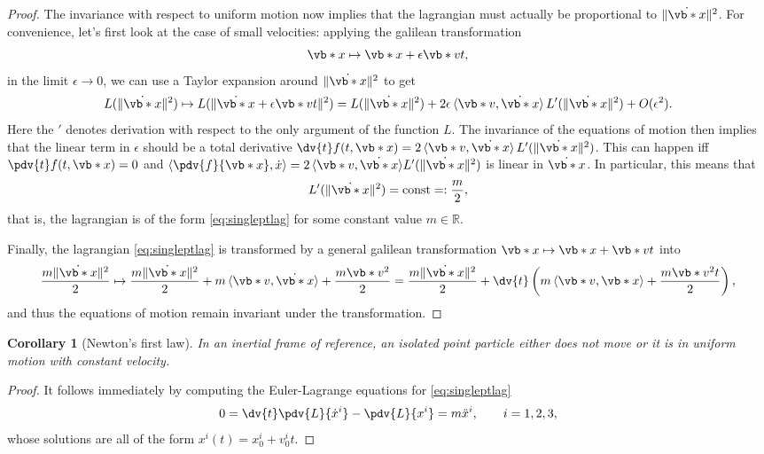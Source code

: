\documentclass[english,fontsize=11pt,paper=b5]{scrbook}
\numberwithin{equation}{chapter}
\newtheorem{corollary}[theorem]{Corollary}
\theoremstyle{definition}
\begin{document}
\begin{proof}
      The invariance with respect to uniform motion now implies that the lagrangian must actually be proportional to $\|\dot{\vb*{x}}\|^2$.
      For convenience, let's first look at the case of small velocities: applying the galilean transformation
      \begin{equation}
        \vb*{x} \mapsto \vb*{x} + \epsilon \vb*{v}t,
      \end{equation}
      in the limit $\epsilon \to 0$, we can use a Taylor expansion around $\|\dot{\vb*{x}}\|^2$ to get
      \begin{equation}
        L(\|\dot{\vb*{x}}\|^2) \mapsto L(\|\dot{\vb*{x}} + \epsilon \vb*{v}t\|^2) = L(\|\dot{\vb*{x}}\|^2) + 2\epsilon\,\langle\vb*{v}, \dot{\vb*{x}}\rangle\,L'(\|\dot{\vb*{x}}\|^2) + O(\epsilon^2).
      \end{equation}
      Here the $'$ denotes derivation with respect to the only argument of the function $L$.
      The invariance of the equations of motion then implies that the linear term in $\epsilon$ should be a total derivative $\dv{t} f(t, \vb*{x}) = 2\,\langle\vb*{v}, \dot{\vb*{x}}\rangle\,L'(\|\dot{\vb*{x}}\|^2)$.
      This can happen iff $\pdv{t} f(t, \vb*{x}) = 0$ and $\langle \pdv{f}{\vb*{x}}, \dot x\rangle  = 2\,\langle\vb*{v}, \dot{\vb*{x}}\rangle L'(\|\dot{\vb*{x}}\|^2)$ is linear in $\dot{\vb*{x}}$.
      In particular, this means that
      \begin{equation}
        L'(\|\dot{\vb*{x}}\|^2) = \mathrm{const} =: \frac{m}2,
      \end{equation}
      that is, the lagrangian is of the form \eqref{eq:singleptlag} for some constant value $m\in\mathbb{R}$.

      Finally, the lagrangian \eqref{eq:singleptlag} is transformed by a general galilean transformation $\vb*{x} \mapsto \vb*{x} + \vb*{v}t$ into
      \begin{equation}
        \frac{m \|\dot{\vb*{x}}\|^2}2 \mapsto
        \frac{m \|\dot{\vb*{x}}\|^2}2 + m\,\langle\vb*{v},\dot{\vb*{x}}\rangle + \frac{m \vb*{v}^2}2
        = \frac{m \|\dot{\vb*{x}}\|^2}2 + \dv{t}\left(m\,\langle\vb*{v},\vb*{x}\rangle + \frac{m \vb*{v}^2 t}2\right),
      \end{equation}
      and thus the equations of motion remain invariant under the transformation.
    \end{proof}

    \begin{corollary}[Newton's first law]\label{cor:Nfl}
      In an inertial frame of reference, an isolated point particle either does not move or it is in uniform motion with constant velocity.
    \end{corollary}
    \begin{proof}
      It follows immediately by computing the Euler-Lagrange equations for \eqref{eq:singleptlag}
      \begin{equation}
        0 = \dv{t} \pdv{L}{\dot x^i} - \pdv{L}{x^i} = m \ddot x^i, \qquad i=1,2,3,
      \end{equation}
      whose solutions are all of the form $x^i(t) = x^i_0 + v^i_0 t$.
    \end{proof}
\end{document}
